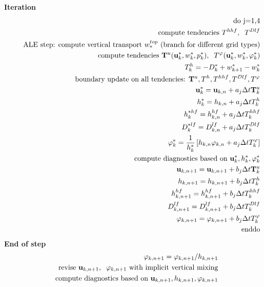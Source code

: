 \documentclass[11pt]{report}
\begin{document}
{\bf Iteration}
\begin{eqnarray} &&
\mbox{do j=1,4} \\&& \hspace{.5cm}
\mbox{compute tendencies } 
T^{hhf}, \;\;
T^{Dlf} \\ && \hspace{.5cm}
\mbox{ALE step: compute vertical transport $w^{top}_*$} 
\mbox{ (branch for different grid types)}\\ && \hspace{.5cm}
\mbox{compute tendencies } 
{\bf T}^u({\bf u}_k^*,w_k^*,p_k^*), \;\;
T^\varphi({\bf u}_k^*,w_k^*,\varphi_k^*) \\ && \hspace{.5cm}\hspace{.5cm}
T^h_k = -D_k^* + w_{k+1}^* - w_{k}^* \\ && \hspace{.5cm}
\mbox{boundary update on all tendencies: } {\bf T}^u,T^h,T^{hhf},T^{Dlf},T^\varphi\\&& \hspace{.5cm}
{\bf u}^*_k = {\bf u}_{k,n} + a_j \Delta t {\bf T}^u_k \\&& \hspace{.5cm}
h^*_k = h_{k,n} + a_j \Delta t T^h_k \\&& \hspace{.5cm}
h^{*hf}_k = h^{hf}_{k,n} + a_j \Delta t T^{hhf}_k \\&& \hspace{.5cm}
D^{*lf}_k = D^{lf}_{k,n} + a_j \Delta t T^{Dlf}_k \\&& \hspace{.5cm}
{\varphi}_k^* = \frac{1}{h_k^*} \left[
h_{k,n} \varphi_{k,n} 
+ a_j \Delta t  T^\varphi_k \right]
\\&& \hspace{.5cm}
\mbox{compute diagnostics based on }{\bf u}_k^*,h_k^*,\varphi_k^* \\&& \hspace{.5cm}
{\bf u}_{k,n+1} = {\bf u}_{k,n+1} + b_j \Delta t {\bf T}^u_k \\&& \hspace{.5cm}
h_{k,n+1} = h_{k,n+1} + b_j \Delta t T^h_k \\&& \hspace{.5cm}
h^{hf}_{k,n+1} = h^{hf}_{k,n+1} + b_j \Delta t T^{hhf}_k \\&& \hspace{.5cm}
D^{lf}_{k,n+1} = D^{lf}_{k,n+1} + b_j \Delta t T^{Dlf}_k \\&& \hspace{.5cm}
{\varphi}_{k,n+1} = 
 \varphi_{k,n+1} 
+ b_j \Delta t  T^\varphi_k \\&&
\mbox{enddo}
\end{eqnarray}
{\bf End of step}
\begin{eqnarray} &&
\varphi_{k,n+1} = 
 \varphi_{k,n+1} / h_{k,n+1} \\&&
\mbox{revise } {\bf u}_{k,n+1},\;\;\varphi_{k,n+1} \mbox{ with implicit vertical mixing}\\&&
\mbox{compute diagnostics based on }{\bf u}_{k,n+1},h_{k,n+1},\varphi_{k,n+1} 
\end{eqnarray}
\end{document}
